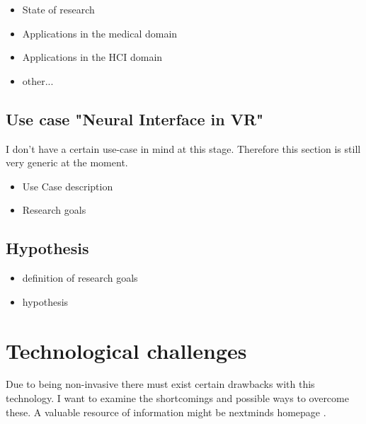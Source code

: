            \begin{itemize}
                \item State of research
                \item Applications in the medical domain
                \item Applications in the HCI domain
                \item other...
            \end{itemize}

        \section{Use case "Neural Interface in VR"}


            I don't have a certain use-case in mind at this stage. Therefore this section is still very generic at the moment.

            \begin{itemize}
                \item Use Case description
                \item Research goals
            \end{itemize}        

        \section{Hypothesis}

            \begin{itemize}
                \item definition of research goals
                \item hypothesis
            \end{itemize}

    \chapter{Technological challenges}

        Due to being non-invasive there must exist certain drawbacks with this technology. I want to examine the shortcomings and possible ways to overcome these.    
        A valuable resource of information might be nextminds homepage \cite{NextMind.}.

